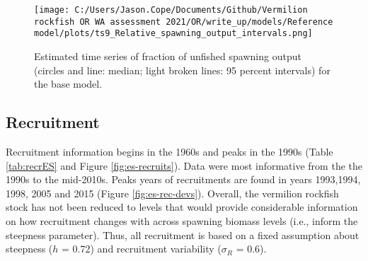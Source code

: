 \documentclass[11pt,
  english,
  a4paper,
]{article}
\begin{document}
\tagmcend\tagstructend


\begin{figure}
\centering
\texttt{[image: C:/Users/Jason.Cope/Documents/Github/Vermilion rockfish OR WA assessment 2021/OR/write\_up/models/Reference model/plots/ts9\_Relative\_spawning\_output\_intervals.png]}
\caption{Estimated time series of fraction of unfished spawning output (circles and line: median; light broken lines: 95 percent intervals) for the base model.\label{fig:es-depl}}
\end{figure}

\tagmcend\tagstructend

\clearpage


\hypertarget{recruitment}{%
\subsection*{Recruitment}\label{recruitment}}

\leavevmode\tagmcend\tagstructend


Recruitment information begins in the 1960s and peaks in the 1990s (Table \ref{tab:recrES} and Figure \ref{fig:es-recruits}). Data were most informative from the the 1990s to the mid-2010s. Peaks years of recruitments are found in years 1993,1994, 1998, 2005 and 2015 (Figure \ref{fig:es-rec-devs}). Overall, the vermilion rockfish stock has not been reduced to levels that would provide considerable information on how recruitment changes with across spawning biomass levels (i.e., inform the steepness parameter). Thus, all recruitment is based on a fixed assumption about steepness ({\(h\)\leavevmode\tagmcend\tagstructend} = 0.72) and recruitment variability ({\(\sigma_R\)\leavevmode\tagmcend\tagstructend} = 0.6).

\leavevmode\tagmcend\tagstructend\par


\end{document}
